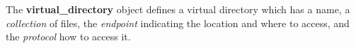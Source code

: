 The \textbf{virtual\_directory} object defines a virtual directory which has
a name, a \textit{collection} of files, the \textit{endpoint} indicating the
location and where to access, and the \textit{protocol} how to access it.